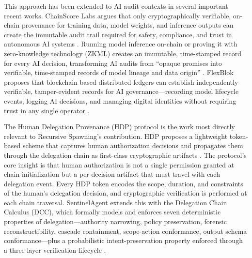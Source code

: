 This approach has been extended to AI audit contexts in several important recent works. ChainScore Labs argues that only cryptographically verifiable, on-chain provenance for training data, model weights, and inference outputs can create the immutable audit trail required for safety, compliance, and trust in autonomous AI systems \cite{on_chain_provenance_ai}. Running model inference on-chain or proving it with zero-knowledge technology (ZKML) creates an immutable, time-stamped record for every AI decision, transforming AI audits from ``opaque promises into verifiable, time-stamped records of model lineage and data origin'' \cite{on_chain_provenance_ai}. FlexBlok proposes that blockchain-based distributed ledgers can establish independently verifiable, tamper-evident records for AI governance---recording model lifecycle events, logging AI decisions, and managing digital identities without requiring trust in any single operator \cite{blockchain_ai_governance}.

The Human Delegation Provenance (HDP) protocol is the work most directly relevant to Recursive Spawning's contribution. HDP proposes a lightweight token-based scheme that captures human authorization decisions and propagates them through the delegation chain as first-class cryptographic artifacts \cite{hdp2025ietf,hdp2025arxiv}. The protocol's core insight is that human authorization is not a single permission granted at chain initialization but a per-decision artifact that must travel with each delegation event. Every HDP token encodes the scope, duration, and constraints of the human's delegation decision, and cryptographic verification is performed at each chain traversal. SentinelAgent extends this with the Delegation Chain Calculus (DCC), which formally models and enforces seven deterministic properties of delegation---authority narrowing, policy preservation, forensic reconstructibility, cascade containment, scope-action conformance, output schema conformance---plus a probabilistic intent-preservation property enforced through a three-layer verification lifecycle \cite{sentinelagent2025}.

